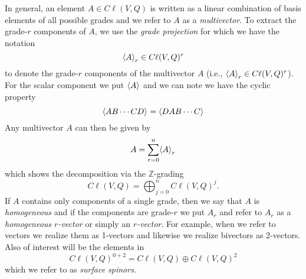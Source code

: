 In general, an element $A \in C\ell(V,Q)$ is written as a linear combination of basis elements of all possible grades and we refer to $A$ as a \emph{multivector}.  To extract the grade-$r$ components of $A$, we use the \emph{grade projection} for which we have the notation
\begin{equation}
\proj{r}{A} \in C\ell(V,Q)^r
\end{equation}
to denote the grade-$r$ components of the multivector $A$ (i.e., $\proj{r}{A} \in C\ell(V,Q)^r$). For the scalar component we put $\proj{}{A}$ and we can note we have the cyclic property
\begin{equation}
\label{eq:cyclic_property}
\proj{}{AB\cdots CD} = \proj{}{DAB\cdots C}
\end{equation} 
Any multivector $A$ can then be given by
\begin{equation}
A = \sum_{r=0}^n \proj{r}{A}
\end{equation}
which shows the decomposition via the $\mathbb{Z}$-grading
\begin{equation}
C\ell(V,Q) = \bigoplus_{j=0}^n C\ell(V,Q)^j.
\end{equation}
If $A$ contains only components of a single grade, then we say that $A$ is \emph{homogeneous} and if the components are grade-$r$ we put $A_r$ and refer to $A_r$ as a \emph{homogeneous $r$-vector} or simply an \emph{$r$-vector}.  For example, when we refer to vectors we realize them as 1-vectors and likewise we realize bivectors as 2-vectors. Also of interest will be the elements in
\begin{equation}
 C\ell(V,Q)^{0+2} = C\ell(V,Q)\oplus C\ell(V,Q)^2
\end{equation}
which we refer to as \emph{surface spinors}. 

